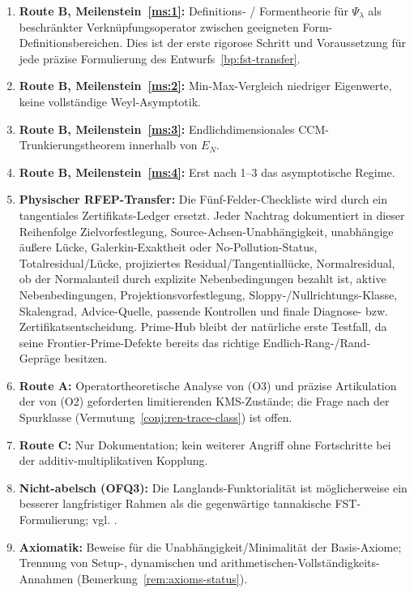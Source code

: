 \documentclass[11pt,a4paper]{article}
\theoremstyle{plain}
\theoremstyle{definition}
\begin{document}
\begin{enumerate}[leftmargin=*]
\item \textbf{Route B, Meilenstein~\ref{ms:1}:} Definitions- / Formentheorie für
  $\Psi_\lambda$ als beschränkter Verknüpfungsoperator zwischen geeigneten
  Form-Definitionsbereichen. Dies ist der erste rigorose Schritt und Voraussetzung
  für jede präzise Formulierung des Entwurfs~\ref{bp:fst-transfer}.
\item \textbf{Route B, Meilenstein~\ref{ms:2}:} Min-Max-Vergleich niedriger Eigenwerte,
  keine vollständige Weyl-Asymptotik.
\item \textbf{Route B, Meilenstein~\ref{ms:3}:} Endlichdimensionales CCM-Trunkierungstheorem
  innerhalb von $E_N$.
\item \textbf{Route B, Meilenstein~\ref{ms:4}:} Erst nach 1--3 das asymptotische Regime.
\item \textbf{Physischer RFEP-Transfer:} Die Fünf-Felder-Checkliste wird
  durch ein tangentiales Zertifikats-Ledger ersetzt. Jeder Nachtrag
  dokumentiert in dieser Reihenfolge Zielvorfestlegung,
  Source-Achsen-Unabhängigkeit, unabhängige äußere Lücke,
  Galerkin-Exaktheit oder
  No-Pollution-Status, Totalresidual/Lücke, projiziertes
  Residual/Tangentiallücke, Normalresidual, ob der Normalanteil durch
  explizite Nebenbedingungen bezahlt ist, aktive Nebenbedingungen,
  Projektionsvorfestlegung, Sloppy-/Nullrichtungs-Klasse, Skalengrad,
  Advice-Quelle, passende Kontrollen und finale Diagnose- bzw.
  Zertifikatsentscheidung. Prime-Hub bleibt der natürliche erste Testfall,
  da seine Frontier-Prime-Defekte bereits das richtige Endlich-Rang-/Rand-Gepräge besitzen.
\item \textbf{Route A:} Operatortheoretische Analyse von (O3) und präzise Artikulation
  der von (O2) geforderten limitierenden KMS-Zustände; die Frage nach der Spurklasse
  (Vermutung~\ref{conj:ren-trace-class}) ist offen.
\item \textbf{Route C:} Nur Dokumentation; kein weiterer Angriff ohne Fortschritte
  bei der additiv-multiplikativen Kopplung.
\item \textbf{Nicht-abelsch (OFQ3):}  Die Langlands-Funktorialität ist möglicherweise
  ein besserer langfristiger Rahmen als die gegenwärtige tannakische FST-Formulierung;
  vgl. \cite{TannakianAxioms}.
\item \textbf{Axiomatik:} Beweise für die Unabhängigkeit/Minimalität der
  Basis-Axiome; Trennung von Setup-, dynamischen und
  arithmetischen-Vollständigkeits-Annahmen (Bemerkung~\ref{rem:axioms-status}).
\end{enumerate}
\end{document}
